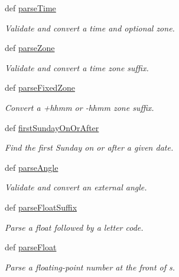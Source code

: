 \begin{DoxyCompactItemize}
def \hyperlink{namespaceamonpy_1_1sim_1_1sidereal__m_a8596a5c8c9f75a134bb44183ceb2b316}{parse\-Time}
\begin{DoxyCompactList}\small\item\em Validate and convert a time and optional zone. \end{DoxyCompactList}\item 
def \hyperlink{namespaceamonpy_1_1sim_1_1sidereal__m_a6644f2c4a9006495308841ec6fbc421e}{parse\-Zone}
\begin{DoxyCompactList}\small\item\em Validate and convert a time zone suffix. \end{DoxyCompactList}\item 
def \hyperlink{namespaceamonpy_1_1sim_1_1sidereal__m_ac1179d5185dead88ac6480ecbb839dee}{parse\-Fixed\-Zone}
\begin{DoxyCompactList}\small\item\em Convert a +hhmm or -\/hhmm zone suffix. \end{DoxyCompactList}\item 
def \hyperlink{namespaceamonpy_1_1sim_1_1sidereal__m_ae0a39ac1b5b3c3ec6ba9f7b3ac786c57}{first\-Sunday\-On\-Or\-After}
\begin{DoxyCompactList}\small\item\em Find the first Sunday on or after a given date. \end{DoxyCompactList}\item 
def \hyperlink{namespaceamonpy_1_1sim_1_1sidereal__m_a9c5df5ef41e8d0c398365cd367a44ece}{parse\-Angle}
\begin{DoxyCompactList}\small\item\em Validate and convert an external angle. \end{DoxyCompactList}\item 
def \hyperlink{namespaceamonpy_1_1sim_1_1sidereal__m_a70719c0e1b101d9942b145597181741a}{parse\-Float\-Suffix}
\begin{DoxyCompactList}\small\item\em Parse a float followed by a letter code. \end{DoxyCompactList}\item 
def \hyperlink{namespaceamonpy_1_1sim_1_1sidereal__m_aae15abbdb32e4142c4901ea2b4a3dbcf}{parse\-Float}
\begin{DoxyCompactList}\small\item\em Parse a floating-\/point number at the front of s. \end{DoxyCompactList}\item 

\end{DoxyCompactItemize}
